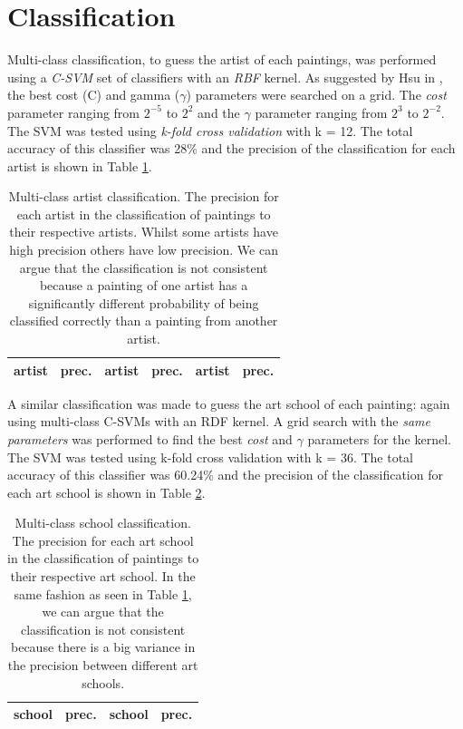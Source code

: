 \documentclass[11pt,a4paper,twoside,openright]{report}
\begin{document}
\section{Classification}

Multi-class classification, to guess the artist of each paintings, was
performed using a \emph{C-SVM} set of classifiers with an \emph{RBF} kernel.
As suggested by Hsu in \cite{hcl03svm}, the best cost (C) and gamma ($\gamma$)
parameters were searched on a grid.  The \emph{cost} parameter ranging from
$2^{-5}$ to $2^2$ and the $\gamma$ parameter ranging from $2^3$ to $2^{-2}$.
The SVM was tested using \emph{k-fold cross validation} with k = 12.  The total
accuracy of this classifier was 28\% and the precision of the classification
for each artist is shown in Table \ref{tab:predart}.

\begin{table}[tpb]
\centering
\begin{tabular}{|l|r||l|r||l|r|}
\toprule
artist & prec. & artist & prec. & artist & prec. \\
\midrule

\bottomrule
\end{tabular}
\caption[Multi-class artist classification]{Multi-class artist classification.
The precision for each artist in the classification of paintings to their
respective artists.  Whilst some artists have high precision others have low
precision.  We can argue that the classification is not consistent because a
painting of one artist has a significantly different probability of being
classified correctly than a painting from another artist.}
\label{tab:predart}
\end{table}

A similar classification was made to guess the art school of each painting:
again using multi-class C-SVMs with an RDF kernel.  A grid search with the
\emph{same parameters} was performed to find the best \emph{cost} and $\gamma$
parameters for the kernel.  The SVM was tested using k-fold cross validation
with k = 36.  The total accuracy of this classifier was 60.24\% and the
precision of the classification for each art school is shown in Table
\ref{tab:predsch}.

\begin{table}[ptb]
\centering
\begin{tabular}{|l|r||l|r|}
\toprule
school & prec. & school & prec. \\
\midrule

\bottomrule
\end{tabular}
\caption[Multi-class school classification]{Multi-class school classification.
The precision for each art school in the classification of paintings to their
respective art school.  In the same fashion as seen in Table \ref{tab:predart},
we can argue that the classification is not consistent because there is a big
variance in the precision between different art schools.}
\label{tab:predsch}
\end{table}
\end{document}
